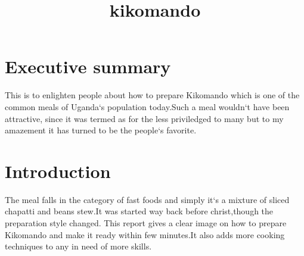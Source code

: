 \documentclass{article}
\begin{document}
\title{kikomando}
\maketitle
\section {Executive summary }{This is to enlighten people about how to prepare Kikomando which is one of the common meals  of Uganda`s  population today.Such a meal wouldn`t  have been  attractive, since it was termed as for the less priviledged to many but to my amazement it has turned to be the people`s favorite. 
}
\section {Introduction} {The meal falls in the category of fast foods and  simply it`s  a mixture of sliced chapatti and beans stew.It was started way back before christ,though the preparation style changed. This report gives a clear image on how to prepare Kikomando and make it ready within  few minutes.It also adds more cooking techniques to any in need of more skills. 
}
\end{document}
